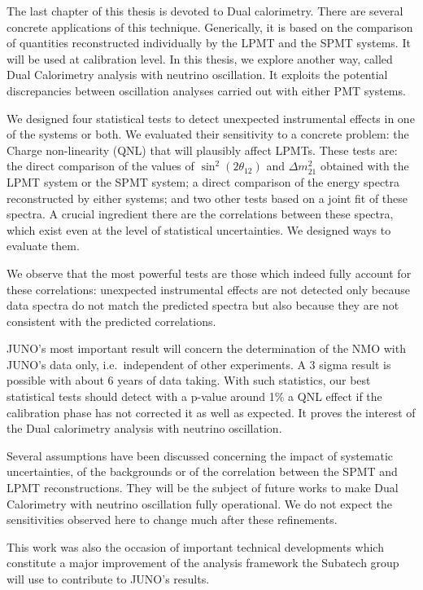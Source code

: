 \documentclass[../main.tex]{subfiles}
\begin{document}
The last chapter of this thesis is devoted to Dual calorimetry. There are several concrete applications of this technique. Generically, it is based on the comparison of quantities reconstructed individually by the LPMT and the SPMT systems. It will be used at calibration level. In this thesis, we explore another way, called Dual Calorimetry analysis with neutrino oscillation. It exploits the potential discrepancies between oscillation analyses carried out with either PMT systems.

We designed four statistical tests to detect unexpected instrumental effects in one of the systems or both. We evaluated their sensitivity to a concrete problem: the Charge non-linearity (QNL) that will plausibly affect LPMTs. These tests are: the direct comparison of the values of $\sin^2(2 \theta_{12})$ and $\Delta m^2_{21}$ obtained with the LPMT system or the SPMT system; a direct comparison of the energy spectra reconstructed by either systems; and two other tests based on a joint fit of these spectra. A crucial ingredient there are the correlations between these spectra, which exist even at the level of statistical uncertainties. We designed ways to evaluate them.

We observe that the most powerful tests are those which indeed fully account for these correlations: unexpected instrumental effects are not detected only because data spectra do not match the predicted spectra but also because they are not consistent with the predicted correlations.

JUNO's most important result will concern the determination of the NMO with JUNO's data only, i.e.\ independent of other experiments. A 3 sigma result is possible with about 6 years of data taking. With such statistics, our best statistical tests should detect with a p-value around 1\% a QNL effect if the calibration phase has not corrected it as well as expected. It proves the interest of the Dual calorimetry analysis with neutrino oscillation.

Several assumptions have been discussed concerning the impact of systematic uncertainties, of the backgrounds or of the correlation between the SPMT and LPMT reconstructions. They will be the subject of future works to make Dual Calorimetry with neutrino oscillation fully operational. We do not expect the sensitivities observed here to change much after these refinements.

This work was also the occasion of important technical developments which constitute a major improvement of the analysis framework the Subatech group will use to contribute to JUNO's results.
\end{document}
